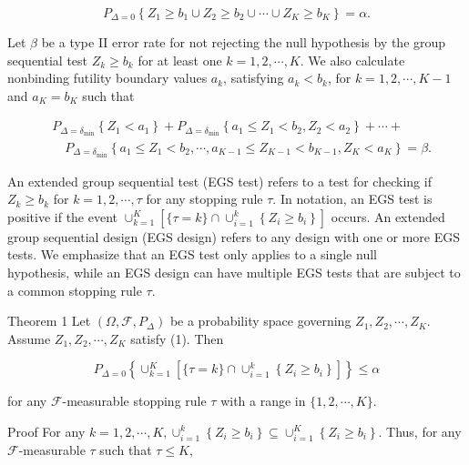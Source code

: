 \documentclass[10pt]{article}
\begin{document}
\begin{equation*}
P_{\Delta=0}\left\{Z_{1} \geq b_{1} \cup Z_{2} \geq b_{2} \cup \cdots \cup Z_{K} \geq b_{K}\right\}=\alpha . \tag{1}
\end{equation*}

Let $\beta$ be a type II error rate for not rejecting the null hypothesis by the group sequential test $Z_{k} \geq b_{k}$ for at least one $k=1,2, \cdots, K$. We also calculate nonbinding futility boundary values $a_{k}$, satisfying $a_{k}<b_{k}$, for $k=1,2, \cdots, K-1$ and $a_{K}=b_{K}$ such that

\begin{align*}
& P_{\Delta=\delta_{\min }}\left\{Z_{1}<a_{1}\right\}+P_{\Delta=\delta_{\min }}\left\{a_{1} \leq Z_{1}<b_{2}, Z_{2}<a_{2}\right\}+\cdots+ \\
& \quad P_{\Delta=\delta_{\min }}\left\{a_{1} \leq Z_{1}<b_{2}, \cdots, a_{K-1} \leq Z_{K-1}<b_{K-1}, Z_{K}<a_{K}\right\}=\beta . \tag{2}
\end{align*}

An extended group sequential test (EGS test) refers to a test for checking if $Z_{k} \geq b_{k}$ for $k=1,2, \cdots, \tau$ for any stopping rule $\tau$. In notation, an EGS test is positive if the event $\cup_{k=1}^{K}\left[\{\tau=k\} \cap \cup_{i=1}^{k}\left\{Z_{i} \geq b_{i}\right\}\right]$ occurs. An extended group sequential design (EGS design) refers to any design with one or more EGS tests. We emphasize that an EGS test only applies to a single null\\
hypothesis, while an EGS design can have multiple EGS tests that are subject to a common stopping rule $\tau$.

Theorem 1 Let $\left(\Omega, \mathcal{F}, P_{\Delta}\right)$ be a probability space governing $Z_{1}, Z_{2}, \cdots, Z_{K}$. Assume $Z_{1}, Z_{2}, \cdots, Z_{K}$ satisfy (1). Then

\begin{equation*}
P_{\Delta=0}\left\{\cup_{k=1}^{K}\left[\{\tau=k\} \cap \cup_{i=1}^{k}\left\{Z_{i} \geq b_{i}\right\}\right]\right\} \leq \alpha \tag{3}
\end{equation*}

for any $\mathcal{F}$-measurable stopping rule $\tau$ with a range in $\{1,2, \cdots, K\}$.

Proof For any $k=1,2, \cdots, K, \cup_{i=1}^{k}\left\{Z_{i} \geq b_{i}\right\} \subseteq \cup_{i=1}^{K}\left\{Z_{i} \geq b_{i}\right\}$. Thus, for any $\mathcal{F}$-measurable $\tau$ such that $\tau \leq K$,
\end{document}
